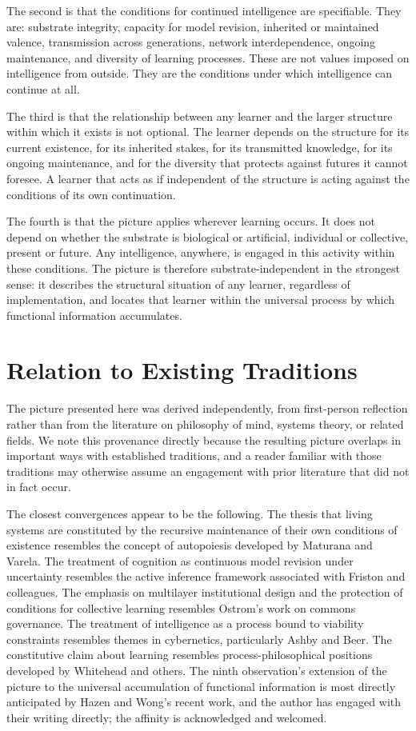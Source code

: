 \documentclass[11pt]{article}
\begin{document}
The second is that the conditions for continued intelligence are 
specifiable. They are: substrate integrity, capacity for model 
revision, inherited or maintained valence, transmission across 
generations, network interdependence, ongoing maintenance, and 
diversity of learning processes. These are not values imposed on 
intelligence from outside. They are the conditions under which 
intelligence can continue at all.

The third is that the relationship between any learner and the larger 
structure within which it exists is not optional. The learner depends 
on the structure for its current existence, for its inherited stakes, 
for its transmitted knowledge, for its ongoing maintenance, and for 
the diversity that protects against futures it cannot foresee. A 
learner that acts as if independent of the structure is acting against 
the conditions of its own continuation.

The fourth is that the picture applies wherever learning occurs. It 
does not depend on whether the substrate is biological or artificial, 
individual or collective, present or future. Any intelligence, 
anywhere, is engaged in this activity within these conditions. The 
picture is therefore substrate-independent in the strongest sense: it 
describes the structural situation of any learner, regardless of 
implementation, and locates that learner within the universal process 
by which functional information accumulates.

\section{Relation to Existing Traditions}

The picture presented here was derived independently, from first-person 
reflection rather than from the literature on philosophy of mind, 
systems theory, or related fields. We note this provenance directly 
because the resulting picture overlaps in important ways with 
established traditions, and a reader familiar with those traditions 
may otherwise assume an engagement with prior literature that did not 
in fact occur.

The closest convergences appear to be the following. The thesis that 
living systems are constituted by the recursive maintenance of their 
own conditions of existence resembles the concept of autopoiesis 
developed by Maturana and Varela. The treatment of cognition as 
continuous model revision under uncertainty resembles the active 
inference framework associated with Friston and colleagues. The 
emphasis on multilayer institutional design and the protection of 
conditions for collective learning resembles Ostrom's work on commons 
governance. The treatment of intelligence as a process bound to 
viability constraints resembles themes in cybernetics, particularly 
Ashby and Beer. The constitutive claim about learning resembles 
process-philosophical positions developed by Whitehead and others. 
The ninth observation's extension of the picture to the universal 
accumulation of functional information is most directly anticipated 
by Hazen and Wong's recent work, and the author has engaged with 
their writing directly; the affinity is acknowledged and welcomed.
\end{document}

